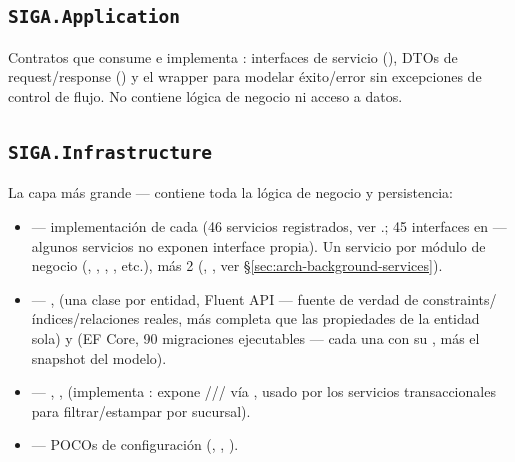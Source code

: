 \subsection{\texttt{SIGA.Application}}
Contratos que consume  e implementa \allowbreak {}: interfaces de servicio (\allowbreak {}), DTOs de request/response () y el wrapper  para modelar éxito/error sin excepciones de control de flujo. No contiene lógica de negocio ni acceso a datos.

\subsection{\texttt{SIGA.Infrastructure}}
La capa más grande --- contiene toda la lógica de negocio y persistencia:
\begin{itemize}
  \item \textbf{} --- implementación de cada  (46 servicios registrados, ver \allowbreak {}.\allowbreak{}; 45 interfaces en \allowbreak {} --- algunos servicios no exponen interface propia). Un servicio por módulo de negocio (, \allowbreak {}, , \allowbreak {}\allowbreak {}, etc.), más 2  (\allowbreak {}\allowbreak {}, \allowbreak {}\allowbreak {}\allowbreak {}, ver \S\ref{sec:arch-background-services}).
  \item \textbf{} --- ,  (una clase \allowbreak {}\allowbreak {} por entidad, Fluent API --- fuente de verdad de constraints/índices/relaciones reales, más completa que las propiedades de la entidad sola) y  (EF Core, 90 migraciones ejecutables --- cada una con su , más el snapshot del modelo).
  \item \textbf{} --- \allowbreak {}\allowbreak {}, , \allowbreak {}\allowbreak {} (implementa \allowbreak {}\allowbreak {}: expone /// vía \allowbreak {}\allowbreak {}, usado por los servicios transaccionales para filtrar/estampar por sucursal).
  \item \textbf{} --- POCOs de configuración (, , ).
\end{itemize}

